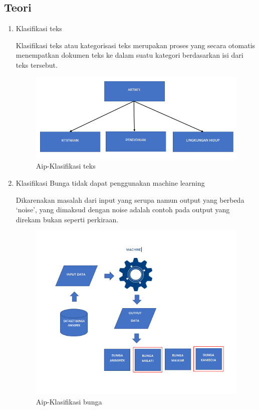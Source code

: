 \subsection{Teori}
\begin{enumerate}
\item Klasifikasi teks
	\par Klasifikasi teks atau kategorisasi teks merupakan proses yang secara otomatis menempatkan dokumen teks ke dalam suatu kategori berdasarkan isi dari teks tersebut. 
	\begin{figure}[!hbtp]
		\centering
		\includegraphics[scale=0.5]{figures/AIP/b1.PNG}
		\caption{Aip-Klasifikasi teks}
		\label{contoh}
	\end{figure}
	
\item Klasifikasi Bunga tidak dapat penggunakan machine learning
	\par Dikarenakan masalah dari input yang serupa namun output yang berbeda ‘noise’, yang dimaksud dengan noise adalah contoh pada output yang direkam bukan seperti perkiraan.
	\begin{figure}[!hbtp]
		\centering
		\includegraphics[scale=0.5]{figures/AIP/b2.PNG}
		\caption{Aip-Klasifikasi bunga}
		\label{contoh}
	\end{figure}


\end{enumerate}
